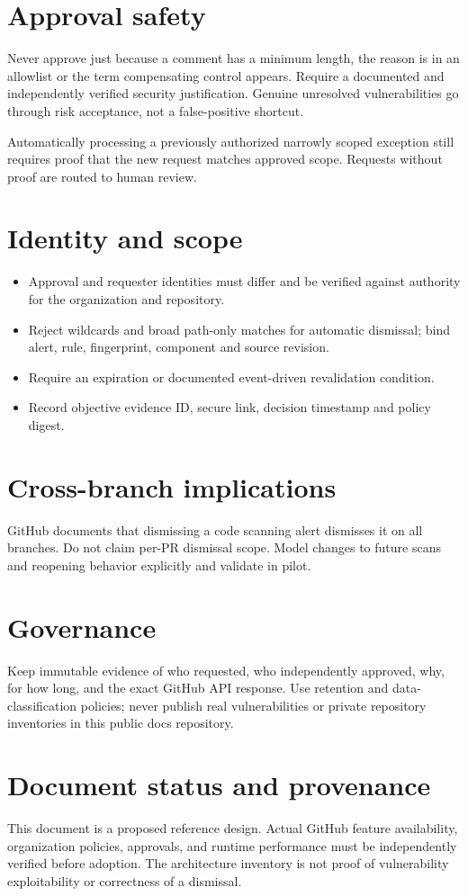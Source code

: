 \documentclass[11pt,letterpaper]{article}
\begin{document}
\section{Approval safety}
Never approve just because a comment has a minimum length, the reason is in an allowlist or the term compensating control appears. Require a documented and independently verified security justification. Genuine unresolved vulnerabilities go through risk acceptance, not a false-positive shortcut.

Automatically processing a previously authorized narrowly scoped exception still requires proof that the new request matches approved scope. Requests without proof are routed to human review.


\section{Identity and scope}
\begin{itemize}
\item Approval and requester identities must differ and be verified against authority for the organization and repository.
\item Reject wildcards and broad path-only matches for automatic dismissal; bind alert, rule, fingerprint, component and source revision.
\item Require an expiration or documented event-driven revalidation condition.
\item Record objective evidence ID, secure link, decision timestamp and policy digest.
\end{itemize}

\section{Cross-branch implications}
GitHub documents that dismissing a code scanning alert dismisses it on all branches. Do not claim per-PR dismissal scope. Model changes to future scans and reopening behavior explicitly and validate in pilot.


\section{Governance}
Keep immutable evidence of who requested, who independently approved, why, for how long, and the exact GitHub API response. Use retention and data-classification policies; never publish real vulnerabilities or private repository inventories in this public docs repository.


\section*{Document status and provenance}
This document is a proposed reference design. Actual GitHub feature availability, organization policies, approvals, and runtime performance must be independently verified before adoption. The architecture inventory is not proof of vulnerability exploitability or correctness of a dismissal.
\end{document}
